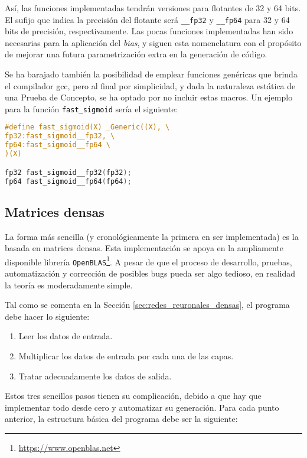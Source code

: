 Así, las funciones implementadas tendrán versiones para flotantes de 32 y 64 bits. El sufijo que indica la precisión del flotante será \texttt{\_\_fp32} y \texttt{\_\_fp64} para 32 y 64 bits de precisión, respectivamente. Las pocas funciones implementadas han sido necesarias para la aplicación del \textit{bias}, y siguen esta nomenclatura con el propósito de mejorar una futura parametrización extra en la generación de código.

Se ha barajado también la posibilidad de emplear funciones genéricas que brinda el compilador gcc, pero al final por simplicidad, y dada la naturaleza estática de una Prueba de Concepto, se ha optado por no incluir estas macros. Un ejemplo para la función \texttt{fast\_sigmoid} sería el siguiente:\medskip
\begin{lstlisting}[language=C]
#define fast_sigmoid(X) _Generic((X), \
fp32:fast_sigmoid__fp32, \
fp64:fast_sigmoid__fp64 \
)(X)

fp32 fast_sigmoid__fp32(fp32);
fp64 fast_sigmoid__fp64(fp64);
\end{lstlisting}


\subsection{Matrices densas}
\label{ssec_gdin_matrices_densas}
La forma más sencilla (y cronológicamente la primera en ser implementada) es la basada en matrices densas. Esta implementación se apoya en la ampliamente disponible librería \texttt{OpenBLAS}\footnote{\url{https://www.openblas.net}}. A pesar de que el proceso de desarrollo, pruebas, automatización y corrección de posibles bugs pueda ser algo tedioso, en realidad la teoría es moderadamente simple.

Tal como se comenta en la Sección \ref{sec:redes_reuronales_densas}, el programa debe hacer lo siguiente:

\begin{enumerate}
    \item Leer los datos de entrada.
    \item Multiplicar los datos de entrada por cada una de las capas.
    \item Tratar adecuadamente los datos de salida.
\end{enumerate}

Estos tres sencillos pasos tienen su complicación, debido a que hay que implementar todo desde cero y automatizar su generación. Para cada punto anterior, la estructura básica del programa debe ser la siguiente:

